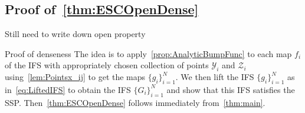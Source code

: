 \documentclass[12pt,]{article}
\theoremstyle{definition}
\theoremstyle{remark}
\newcommand{\0}{\mathbf{0}}
\begin{document}
{\begin{comment}
\begin{align*}
I(x)&\leq \delta \cdot \frac{|f'(y_i)|}{|f(y_i)|} \prod_{\substack{y_j\in\mathcal{Y} \\ y_j\neq y_i}} \frac{(x-y_j)^2}{(y_i - y_j)^2}  \prod_{z_j\in\mathcal{Z}} \frac{(x-z_j)^4}{(y_i - z_j)^4} \\
&\stackrel{\eqref{eq:eta1/3Bound}}{\leq}  \delta \cdot \frac{|f'(y_i)|}{|f(y_i)|}\prod_{\substack{y_j\in\mathcal{Y} \\ y_j\neq y_i}}\!\! \Big( 1+\frac{\eta_i^{1/3}}{|y_i-y_j|} \Big)^2 \prod_{z_j\in\mathcal{Z}}\!\! \Big( 1+\frac{\eta_i^{1/3}}{|y_i-z_j|} \Big)^4. 
\end{align*}
We may assume by choosing $\eta_i$ even smaller if necessary that the product of the final two products is at most say 2. Since we also assume that $f([0,1])\subset (0,1)$ and $0<|f'(x)|<1$ for every $x$, we have shown that $I(x)\leq C\cdot\delta+\varepsilon$ for some constant $C>0$ depending only $f$. This completes the bound for $\| \varphi'' \psi A\|_{\infty}$. 

{\color{red} Quick finish: The argument for bounding $\| \varphi \psi A''\|_{\infty}$ and $2\| \varphi' \psi A'\|_{\infty}$ is completely analogous and is omitted. Or we need to add another 1.5-2 pages. If omitted, then we can change condition~\cref{eq:etaOtherBound} slightly.}
\end{proof}
\end{comment}
\subsection{Proof of~\cref{thm:ESCOpenDense}}

{\color{red}Still need to write down open property}

{\color{red}Proof of denseness} The idea is to apply~\cref{prop:AnalyticBumpFunc} to each map $f_i$ of the IFS with appropriately chosen collection of points $\mathcal{Y}_i$ and $\mathcal{Z}_i$ using~\cref{lem:Pointsx_ij} to get the maps $\{g_i\}_{i=1}^N$. We then lift the IFS $\{g_i\}_{i=1}^N$ as in~\cref{eq:LiftedIFS} to obtain the IFS $\{G_i\}_{i=1}^N$ and show that this IFS satisfies the SSP. Then~\cref{thm:ESCOpenDense} follows immediately from~\cref{thm:main}.

}
\end{document}
